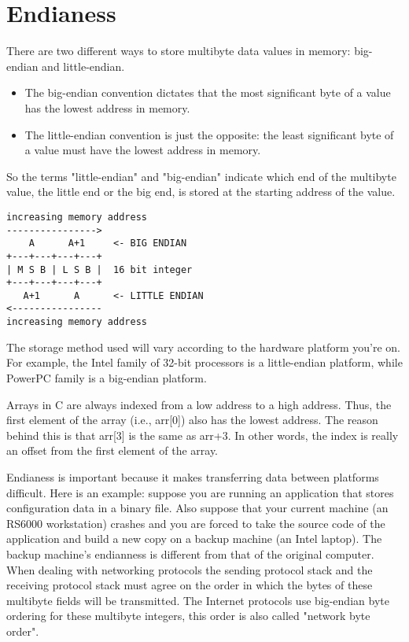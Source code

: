 \documentclass{report}
\begin{document}
\section{Endianess}
There are two different ways to store multibyte data values in memory: big-endian and little-endian.
\begin{itemize}
\item The big-endian convention dictates that the most significant byte of a value has the lowest address in memory.
\item The little-endian convention is just the opposite: the least significant byte of a value must have the lowest address in memory.
\end{itemize}
So the terms "little-endian" and "big-endian" indicate which end of the multibyte value, the little end or the big end, is stored at the starting address of the value.
\begin{verbatim}
increasing memory address
---------------->
    A      A+1     <- BIG ENDIAN
+---+---+---+---+
| M S B | L S B |  16 bit integer
+---+---+---+---+
   A+1      A      <- LITTLE ENDIAN
<----------------
increasing memory address
\end{verbatim}

The storage method used will vary according to the hardware platform you're on. For example, the Intel family of 32-bit processors is a little-endian platform, while PowerPC family is a big-endian platform.
    


Arrays in C are always indexed from a low address to a high address. Thus, the first element of the array (i.e., arr[0]) also has the lowest address. The reason behind this is that arr[3] is the same as arr+3. In other words, the index is really an offset from the first element of the array.

Endianess is important because it makes transferring data between platforms difficult. Here is an example: suppose you are running an application that stores configuration data in a binary file. Also suppose that your current machine (an RS6000 workstation) crashes and you are forced to take the source code of the application and build a new copy on a backup machine (an Intel laptop). The backup machine's endianness is different from that of the original computer.
When dealing with networking protocols the sending protocol stack and the receiving protocol stack must agree on the order in which the bytes of these multibyte fields will be transmitted. The Internet protocols use big-endian byte ordering for these multibyte integers, this order is also called "network byte order". 
\end{document}
